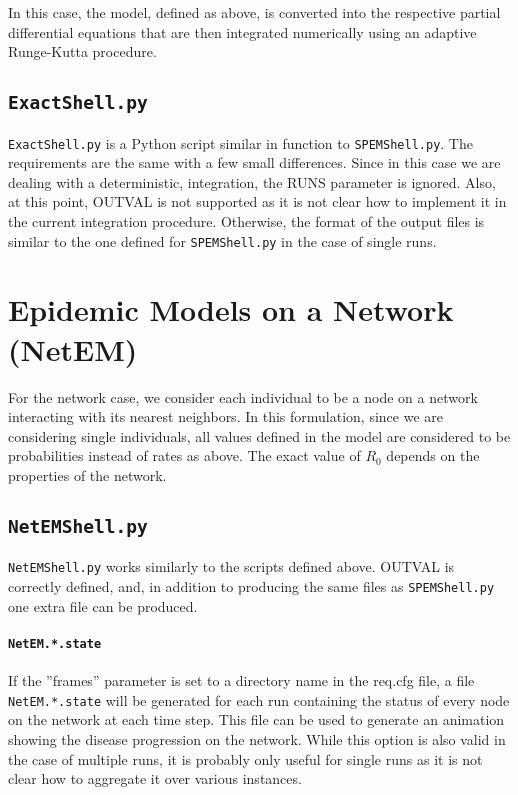 \documentclass[a4paper, 11pt, fleqn]{paper}
\begin{document}
In this case, the model, defined as above, is converted into the respective partial differential equations that are then integrated numerically using an adaptive Runge-Kutta procedure. 

\subsection{\texttt{ExactShell.py}}

\texttt{ExactShell.py} is a Python script similar in function to \texttt{SPEMShell.py}. The requirements are the same with a few small differences. Since in this case we are dealing with a deterministic, integration, the RUNS parameter is ignored. Also, at this point, OUTVAL is not supported as it is not clear how to implement it in the current integration procedure. Otherwise, the format of the output files is similar to the one defined for \texttt{SPEMShell.py} in the case of single runs.

\section{Epidemic Models on a Network (NetEM)}

For the network case, we consider each individual to be a node on a network interacting with its nearest neighbors. In this formulation, since we are considering single individuals, all values defined in the model are considered to be probabilities instead of rates as above. The exact value of $R_{0}$ depends on the properties of the network.

\subsection{\texttt{NetEMShell.py}}

\texttt{NetEMShell.py} works similarly to the scripts defined above. OUTVAL is correctly defined, and, in addition to producing the same files as \texttt{SPEMShell.py} one extra file can be produced.

\paragraph*{\texttt{NetEM.*.state}}

If the ''frames'' parameter is set to a directory name in the req.cfg file, a file \texttt{NetEM.*.state} will be generated for each run containing the status of every node on the network at each time step. This file can be used to generate an animation showing the disease progression on the network. While this option is also valid in the case of multiple runs, it is probably only useful for single runs as it is not clear how to aggregate it over various instances.
\end{document}
